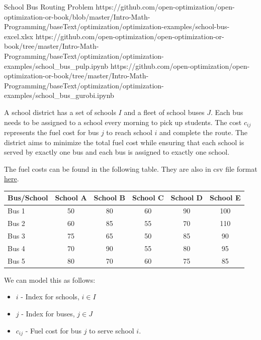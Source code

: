 \begin{examplewithallcode}{School Bus Routing Problem}
{https://github.com/open-optimization/open-optimization-or-book/blob/master/Intro-Math-Programming/baseText/optimization/optimization-examples/school-bus-excel.xlsx}
{https://github.com/open-optimization/open-optimization-or-book/tree/master/Intro-Math-Programming/baseText/optimization/optimization-examples/school_bus_pulp.ipynb}
{https://github.com/open-optimization/open-optimization-or-book/tree/master/Intro-Math-Programming/baseText/optimization/optimization-examples/school_bus_gurobi.ipynb}

A school district has a set of schools \( I \) and a fleet of school buses \( J \). Each bus needs to be assigned to a school every morning to pick up students. The cost \( c_{ij} \) represents the fuel cost for bus \( j \) to reach school \( i \) and complete the route. The district aims to minimize the total fuel cost while ensuring that each school is served by exactly one bus and each bus is assigned to exactly one school.

The fuel costs can be found in the following table.  They are also in csv file format \href{https://github.com/open-optimization/open-optimization-or-examples/blob/master/integer-programming/school_bus_data.csv}{here}.
\begin{tabular}{l|ccccc}
\toprule
Bus/School & School A & School B & School C & School D & School E \\
\midrule
Bus 1 & 50 & 80 & 60 & 90 & 100 \\
Bus 2 & 60 & 85 & 55 & 70 & 110 \\
Bus 3 & 75 & 65 & 50 & 85 & 90 \\
Bus 4 & 70 & 90 & 55 & 80 & 95 \\
Bus 5 & 80 & 70 & 60 & 75 & 85 \\
\bottomrule
\end{tabular}
\par{}\label{tab:modeling-sums-tab03}%


We can model this as follows:

\begin{itemize}
    \item \(i \) - Index for schools, \(i \in I\)
    \item \(j \) - Index for buses, \(j \in J\)
\end{itemize}

\begin{itemize}
    \item \(c_{ij} \) - Fuel cost for bus \(j\) to serve school \(i\).
\end{itemize}


\end{examplewithallcode}
